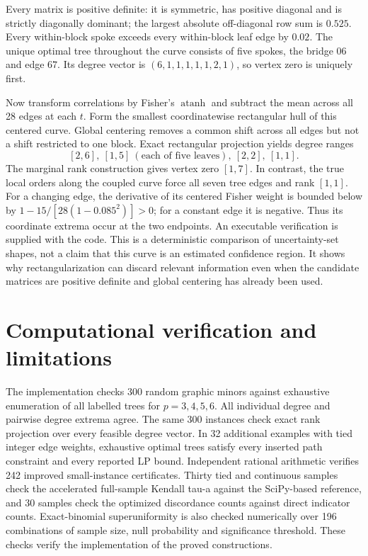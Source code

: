 \documentclass[11pt]{article}
\theoremstyle{plain}
\theoremstyle{definition}\newtheorem{remark}{Remark}\newtheorem{example}{Example}
\begin{document}
Every matrix is positive definite: it is symmetric, has positive diagonal and is strictly diagonally dominant; the largest absolute off-diagonal row sum is $0.525$. Every within-block spoke exceeds every within-block leaf edge by $0.02$. The unique optimal tree throughout the curve consists of five spokes, the bridge $06$ and edge $67$. Its degree vector is $(6,1,1,1,1,1,2,1)$, so vertex zero is uniquely first.

Now transform correlations by Fisher's $\operatorname{atanh}$ and subtract the mean across all 28 edges at each $t$. Form the smallest coordinatewise rectangular hull of this centered curve. Global centering removes a common shift across all edges but not a shift restricted to one block. Exact rectangular projection yields degree ranges
\[
 [2,6],\ [1,5]\ (\text{each of five leaves}),\ [2,2],\ [1,1].
\]
The marginal rank construction gives vertex zero $[1,7]$. In contrast, the true local orders along the coupled curve force all seven tree edges and rank $[1,1]$. For a changing edge, the derivative of its centered Fisher weight is bounded below by $1-15/[28(1-0.085^2)]>0$; for a constant edge it is negative. Thus its coordinate extrema occur at the two endpoints. An executable verification is supplied with the code. This is a deterministic comparison of uncertainty-set shapes, not a claim that this curve is an estimated confidence region. It shows why rectangularization can discard relevant information even when the candidate matrices are positive definite and global centering has already been used.



\section{Computational verification and limitations}
The implementation checks 300 random graphic minors against exhaustive enumeration of all labelled trees for $p=3,4,5,6$. All individual degree and pairwise degree extrema agree. The same 300 instances check exact rank projection over every feasible degree vector. In 32 additional examples with tied integer edge weights, exhaustive optimal trees satisfy every inserted path constraint and every reported LP bound. Independent rational arithmetic verifies 242 improved small-instance certificates. Thirty tied and continuous samples check the accelerated full-sample Kendall tau-a against the SciPy-based reference, and 30 samples check the optimized discordance counts against direct indicator counts. Exact-binomial superuniformity is also checked numerically over 196 combinations of sample size, null probability and significance threshold. These checks verify the implementation of the proved constructions.
\end{document}
